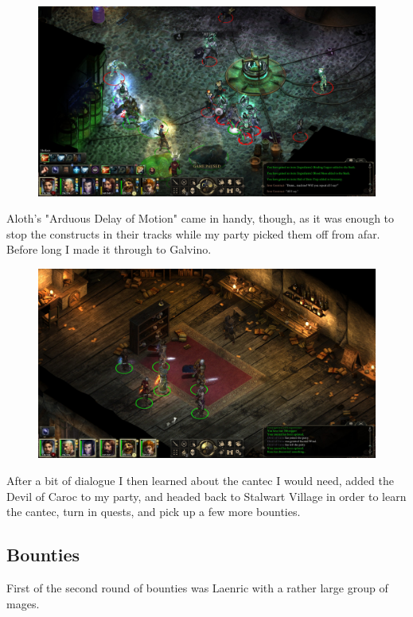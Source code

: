 \documentclass{article}
\begin{document}
\begin{figure}
\includegraphics[scale=0.33]{files/blog/2019_08_17_poe_potd_wmpt1/2019_08_17_durgans_battery_outside_3.jpg}
\end{figure}

Aloth's "Arduous Delay of Motion" came in handy, though, as it was enough to stop the constructs in their tracks while my party picked them off from afar.  Before long I made it through to Galvino.

\begin{figure}
\includegraphics[scale=0.33]{files/blog/2019_08_17_poe_potd_wmpt1/2019_08_17_durgans_battery_outside_4.jpg}
\end{figure}

After a bit of dialogue I then learned about the cantec I would need, added the Devil of Caroc to my party, and headed back to Stalwart Village in order to learn the cantec, turn in quests, and pick up a few more bounties.

\subsection{Bounties}
First of the second round of bounties was Laenric with a rather large group of mages.
\end{document}
